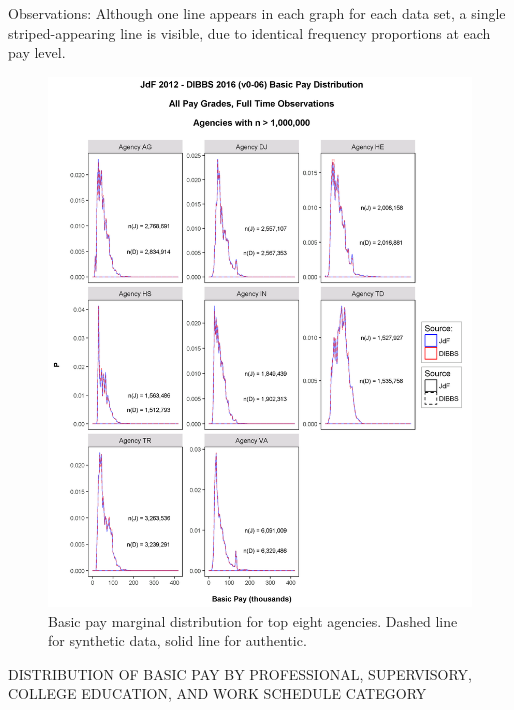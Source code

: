 \documentclass[10pt, letterpaper]{article}
\begin{document}
\begin{spacing}{1.0}
Observations:  Although one line appears in each graph for each data set, a single striped-appearing line is visible, due to identical frequency proportions at each pay level. 

\vspace{12pt}

\begin{figure}[h]
    \centering
    \includegraphics[width=6in, trim={0 0 0 1in}, clip]{JdFDIBBSBasicPayDistribution.png}
    \caption{Basic pay marginal distribution for top eight agencies.  Dashed line for synthetic data, solid line for authentic.}
    \label{figure:JdFDIBBSBasicPayDistribution}
\end{figure}

\clearpage

DISTRIBUTION OF BASIC PAY BY PROFESSIONAL, SUPERVISORY, COLLEGE EDUCATION, AND WORK SCHEDULE CATEGORY\\


\end{spacing}
\end{document}
